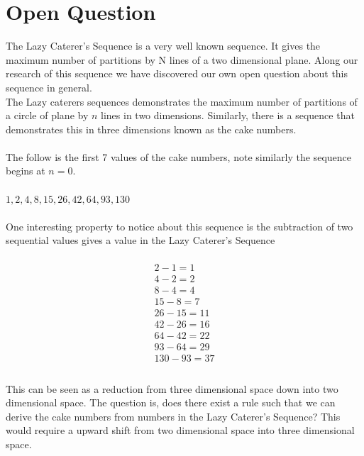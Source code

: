 \documentclass[a4paper,10pt]{article}
\begin{document}
\section{Open Question}
The Lazy Caterer's Sequence is a very well known sequence. It gives the maximum number of partitions by N lines of a two dimensional plane. Along our research of this sequence we have discovered our own open question about this sequence in general.
\\
The Lazy caterers sequences demonstrates the maximum number of partitions of a circle of plane by $n$ lines in two dimensions. Similarly, there is a sequence that demonstrates this in three dimensions known as the cake numbers.\\
\\
The follow is the first 7 values of the cake numbers, note similarly the sequence begins at $n=0$.\\
\\
$1, 2, 4, 8, 15, 26, 42, 64, 93, 130$\\
\\
One interesting property to notice about this sequence is the subtraction of two sequential values gives a value in the Lazy Caterer's Sequence\\
\\
\[
\boxed{
	\begin{gathered}
		{2-1 = 1}\\
		{4-2 = 2} \\
		{8-4 = 4} \\
		{15-8 = 7} \\
		{26-15 = 11}\\
		{42-26 = 16}\\
		{64-42 = 22}\\
		{93-64 = 29}\\
		{130-93 = 37}\\
	\end{gathered}
	}
\]
\\
This can be seen as a reduction from three dimensional space down into two dimensional space. The question is, does there exist a rule such that we can derive the cake numbers from numbers in the Lazy Caterer's Sequence? This would require a upward shift from two dimensional space into three dimensional space.
    
\end{document}
